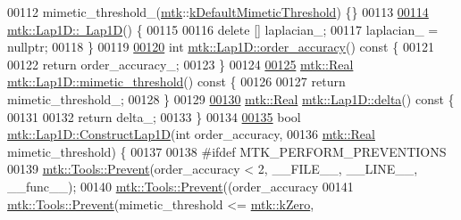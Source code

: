 \begin{DoxyCode}
00112   mimetic\_threshold\_(\hyperlink{namespacemtk}{mtk}::\hyperlink{group__c01-roots_ga35718d949bdc81a08a9cc8ebbe3478a2}{kDefaultMimeticThreshold}) \{\}
00113 
\hypertarget{mtk__lap__1d_8cc_source_l00114}{}\hyperlink{classmtk_1_1Lap1D_ac0cb868243a66658cc46de5b818fa4e8}{00114} \hyperlink{classmtk_1_1Lap1D_ac0cb868243a66658cc46de5b818fa4e8}{mtk::Lap1D::~Lap1D}() \{
00115 
00116   \textcolor{keyword}{delete} [] laplacian\_;
00117   laplacian\_ = \textcolor{keyword}{nullptr};
00118 \}
00119 
\hypertarget{mtk__lap__1d_8cc_source_l00120}{}\hyperlink{classmtk_1_1Lap1D_ae3490534a9e950df3f81b3840c31b13a}{00120} \textcolor{keywordtype}{int} \hyperlink{classmtk_1_1Lap1D_ae3490534a9e950df3f81b3840c31b13a}{mtk::Lap1D::order\_accuracy}()\textcolor{keyword}{ const }\{
00121 
00122   \textcolor{keywordflow}{return} order\_accuracy\_;
00123 \}
00124 
\hypertarget{mtk__lap__1d_8cc_source_l00125}{}\hyperlink{classmtk_1_1Lap1D_a957ae4ff6053d605ac7b93650ad6f188}{00125} \hyperlink{group__c01-roots_gac080bbbf5cbb5502c9f00405f894857d}{mtk::Real} \hyperlink{classmtk_1_1Lap1D_a957ae4ff6053d605ac7b93650ad6f188}{mtk::Lap1D::mimetic\_threshold}()\textcolor{keyword}{ const }\{
00126 
00127   \textcolor{keywordflow}{return} mimetic\_threshold\_;
00128 \}
00129 
\hypertarget{mtk__lap__1d_8cc_source_l00130}{}\hyperlink{classmtk_1_1Lap1D_a4e16e80c6dd845ac42bda23385a1c56e}{00130} \hyperlink{group__c01-roots_gac080bbbf5cbb5502c9f00405f894857d}{mtk::Real} \hyperlink{classmtk_1_1Lap1D_a4e16e80c6dd845ac42bda23385a1c56e}{mtk::Lap1D::delta}()\textcolor{keyword}{ const }\{
00131 
00132   \textcolor{keywordflow}{return} delta\_;
00133 \}
00134 
\hypertarget{mtk__lap__1d_8cc_source_l00135}{}\hyperlink{classmtk_1_1Lap1D_a685dcba88c08cf5b7b6c2aa4669a472c}{00135} \textcolor{keywordtype}{bool} \hyperlink{classmtk_1_1Lap1D_a685dcba88c08cf5b7b6c2aa4669a472c}{mtk::Lap1D::ConstructLap1D}(\textcolor{keywordtype}{int} order\_accuracy,
00136                                 \hyperlink{group__c01-roots_gac080bbbf5cbb5502c9f00405f894857d}{mtk::Real} mimetic\_threshold) \{
00137 
00138 \textcolor{preprocessor}{  #ifdef MTK\_PERFORM\_PREVENTIONS}
00139   \hyperlink{classmtk_1_1Tools_a332324c6f25e66be9dff48c5987a3b9f}{mtk::Tools::Prevent}(order\_accuracy < 2, \_\_FILE\_\_, \_\_LINE\_\_, \_\_func\_\_);
00140   \hyperlink{classmtk_1_1Tools_a332324c6f25e66be9dff48c5987a3b9f}{mtk::Tools::Prevent}((order\_accuracy%
00141   \hyperlink{classmtk_1_1Tools_a332324c6f25e66be9dff48c5987a3b9f}{mtk::Tools::Prevent}(mimetic\_threshold <= \hyperlink{group__c01-roots_ga59a451a5fae30d59649bcda274fea271}{mtk::kZero},

\end{DoxyCode}
